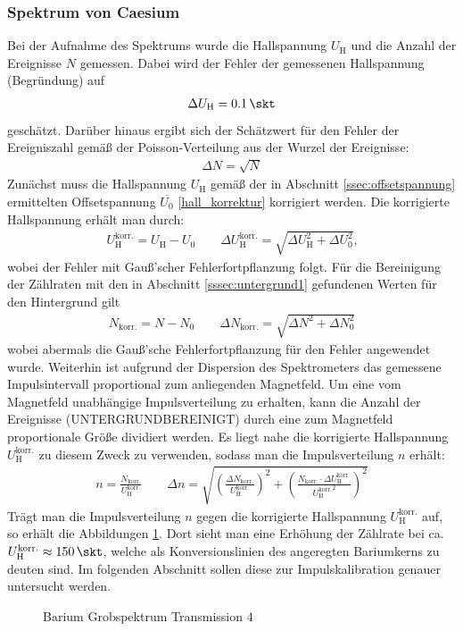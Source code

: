 \documentclass[11pt, a4paper]{article}
\numberwithin{equation}{section}
\begin{document}
\subsubsection{Spektrum von Caesium}
\label{sssec:spektrum_caesium}
Bei der Aufnahme des Spektrums wurde die Hallspannung $U_\mathrm{H}$ und die Anzahl der Ereignisse $N$ gemessen.
Dabei wird der Fehler der gemessenen Hallspannung (Begründung) auf
\begin{align*}
	\Delta U_\mathrm{H} = \SI{0.1}{\skt}
\end{align*}
geschätzt.
Darüber hinaus ergibt sich der Schätzwert für den Fehler der Ereigniszahl gemäß der Poisson-Verteilung aus der Wurzel der Ereignisse:
\begin{align*}
	\Delta N = \sqrt{N}
\end{align*}
Zunächst muss die Hallspannung $U_\mathrm{H}$ gemäß der in Abschnitt \ref{ssec:offsetspannung} ermittelten Offsetspannung $\overline{U_0}$ \eqref{hall_korrektur} korrigiert werden.
Die korrigierte Hallspannung erhält man durch:
\begin{align}
U_\mathrm{H}^\mathrm{korr.} = U_\mathrm{H} - U_0 \qquad
\Delta U_\mathrm{H}^\mathrm{korr.} = \sqrt{\Delta U_\mathrm{H}^2 + \Delta U_0^2} \text{,}
\end{align}
wobei der Fehler mit Gauß'scher Fehlerfortpflanzung folgt.
Für die Bereinigung der Zählraten mit den in Abschnitt \ref{sssec:untergrund1} gefundenen Werten für den Hintergrund gilt
\begin{align}
	N_\mathrm{korr.} = N - N_0 \qquad \Delta N_\mathrm{korr.} = \sqrt{\Delta N^2 + \Delta N_0^2}
\end{align}
wobei abermals die Gauß'sche Fehlerfortpflanzung für den Fehler angewendet wurde.
Weiterhin ist aufgrund der Dispersion des Spektrometers das gemessene Impulsintervall proportional zum anliegenden Magnetfeld.
Um eine vom Magnetfeld unabhängige Impulsverteilung zu erhalten, kann die Anzahl der Ereignisse (UNTERGRUNDBEREINIGT) durch eine zum Magnetfeld proportionale Größe dividiert werden.
Es liegt nahe die korrigierte Hallspannung $U_\mathrm{H}^\mathrm{korr.}$ zu diesem Zweck zu verwenden, sodass man die Impulsverteilung $n$ erhält:
\begin{align}
	n = \frac{N_\mathrm{korr.}}{U_\mathrm{H}^\mathrm{korr.}} \qquad \Delta n = \sqrt{\left( \frac{\Delta N_\mathrm{korr.}}{U_\mathrm{H}^\mathrm{korr.}}\right)^2 + \left( \frac{N_\mathrm{korr.} \cdot \Delta U_\mathrm{H}^\mathrm{korr.}}{ {U_\mathrm{H}^\mathrm{korr.}}^2 }\right)^2}
\end{align}
Trägt man die Impulsverteilung $n$ gegen die korrigierte Hallspannung $U_\mathrm{H}^\mathrm{korr.}$ auf, so erhält die Abbildungen \ref{fig:ba_t4_grob}.
Dort sieht man eine Erhöhung der Zählrate bei ca. $U_\mathrm{H}^\mathrm{korr.} \approx \SI{150}{\skt}$, welche als Konversionslinien des angeregten Bariumkerns zu deuten sind.
Im folgenden Abschnitt sollen diese zur Impulskalibration genauer untersucht werden.
\begin{figure}[h]
	\centering
	
	\caption{Barium Grobspektrum Transmission 4}
	\label{fig:ba_t4_grob}
\end{figure}
\end{document}
